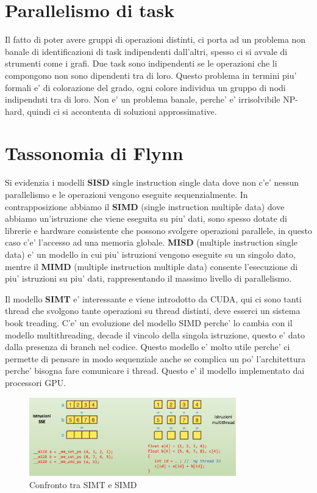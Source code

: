\section{Parallelismo di task}
Il fatto di poter avere gruppi di operazioni distinti, ci porta ad un problema non banale di identificazioni di task indipendenti dall'altri, spesso ci si avvale di strumenti come i grafi. Due task sono indipendenti se le operazioni che li compongono non sono dipendenti tra di loro. Questo problema in termini piu' formali e' di colorazione del grado, ogni colore individua un gruppo di nodi indipendnti tra di loro.
Non e' un problema banale, perche' e' irrisolvibile NP-hard, quindi ci si accontenta di soluzioni approssimative.

\section{Tassonomia di Flynn}
Si evidenzia i modelli \textbf{SISD} single instruction single data dove non c'e' nessun parallelismo e le operazioni vengono eseguite sequenzialmente.
In contrapposizione abbiamo il \textbf{SIMD} (single instruction multiple data) dove abbiamo un'istruzione che viene eseguita su piu' dati, sono spesso dotate di librerie e hardware consistente che possono svolgere operazioni parallele, in questo caso c'e' l'accesso ad una memoria globale.
\textbf{MISD} (multiple instruction single data) e' un modello in cui piu' istruzioni vengono eseguite su un singolo dato, mentre il \textbf{MIMD} (multiple instruction multiple data) consente l'esecuzione di piu' istruzioni su piu' dati, rappresentando il massimo livello di parallelismo.

Il modello \textbf{SIMT} e' interessante e viene introdotto da CUDA, qui ci sono tanti thread che svolgono tante operazioni su thread distinti, deve esserci un sistema book treading. C'e' un evoluzione del modello SIMD perche' lo cambia con il modello multithreading, decade il vincolo della singola istruzione, questo e' dato dalla presenza di branch nel codice. Questo modello e' molto utile perche' ci permette di pensare in modo sequenziale anche se complica un po' l'architettura perche' bisogna fare comunicare i thread. Questo e' il modello implementato dai processori GPU.

\begin{figure}
    \centering
    \includegraphics[width=0.8\textwidth]{images/simtvssimd.png}
    \caption{Confronto tra SIMT e SIMD}
\end{figure}

